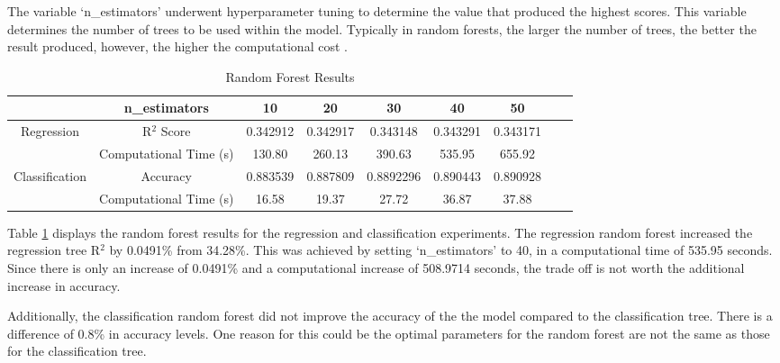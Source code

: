 \documentclass[../thesis.tex]{subfiles}
\begin{document}
The variable `n\_estimators' underwent hyperparameter tuning to determine the value that produced the highest scores. This variable determines the number of trees to be used within the model. Typically in random forests, the larger the number of trees, the better the result produced, however, the higher the computational cost \cite{Pillai2020}.

\begin{table}[h!]
    \centering
    \begin{tabular}{ccccccccc}\toprule
       & \textbf{n\_estimators} &  10 & 20 & 30 & 40 & 50 \\\midrule
       \multirow{2}{*}{Regression} & R$^{2}$ Score &  0.342912 & 0.342917 & 0.343148 & 0.343291 &  0.343171\\
      &  Computational Time (s) &130.80 & 260.13 & 390.63 & 535.95 & 655.92\\ \midrule
        \multirow{2}{*}{Classification} & Accuracy & 0.883539 & 0.887809 & 0.8892296 & 0.890443 & 0.890928 \\
        & Computational Time (s) & 16.58 & 19.37 & 27.72& 36.87& 37.88\\\bottomrule
        
    \end{tabular}
    \caption{Random Forest Results}
    \label{tab:RandomForestResults}
\end{table}

Table \ref{tab:RandomForestResults} displays the random forest results for the regression and classification experiments. The regression random forest increased the regression tree R$^{2}$ by 0.0491\% from 34.28\%. This was achieved by setting `n\_estimators' to 40, in a computational time of 535.95 seconds. Since there is only an increase of 0.0491\% and a computational increase of 508.9714 seconds, the trade off is not worth the additional increase in accuracy.

Additionally, the classification random forest did not improve the accuracy of the the model compared to the classification tree. There is a difference of 0.8\% in accuracy levels. One reason for this could be the optimal parameters for the random forest are not the same as those for the classification tree. 



\end{document}
